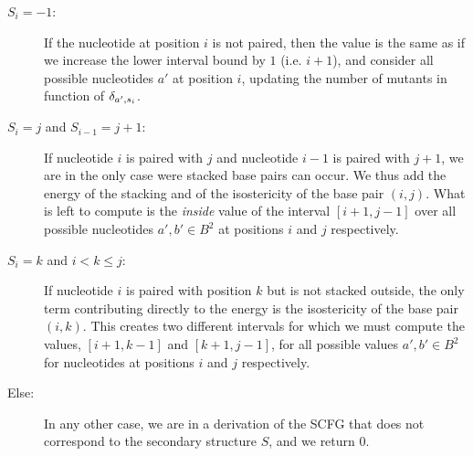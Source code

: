 \begin{description}
\item[$S_{i}=-1$:] If the nucleotide at position $i$ is not paired, then the value is the same
as if we increase the lower interval bound by $1$ (i.e. $i+1$), and consider all possible
 nucleotides $a'$ at position $i$, updating the number of mutants in function of $\delta_{a',s_i}$. 
\item[$S_i=j$ and $S_{i-1}=j+1$:] If nucleotide $i$ is paired with $j$ and nucleotide $i-1$ is
paired with $j+1$, we are in the only case were stacked base pairs can occur. We thus add
the energy of the stacking and of the isostericity of the base pair $(i,j)$. What is left
to compute is the \emph{inside} value of the interval $[i+1,j-1]$ over all possible nucleotides 
$a',b'\in B^2$ at positions $i$ and $j$ respectively.
\item[$S_i=k$ and $i<k \leq j$:] If nucleotide $i$ is paired with position $k$ 
but is not stacked outside, the 
only term contributing directly to the energy is the isostericity of the base pair $(i,k)$. This 
creates
two different intervals for which we must compute the values, $[i+1,k-1]$ and $[k+1,j-1]$, for 
all possible values $a',b'\in B^2$ for nucleotides at positions $i$ and $j$ respectively.
\item[Else:] In any other case, we are in a derivation of the SCFG that does not correspond to the 
secondary structure $S$, and we return $0$.
\end{description}

